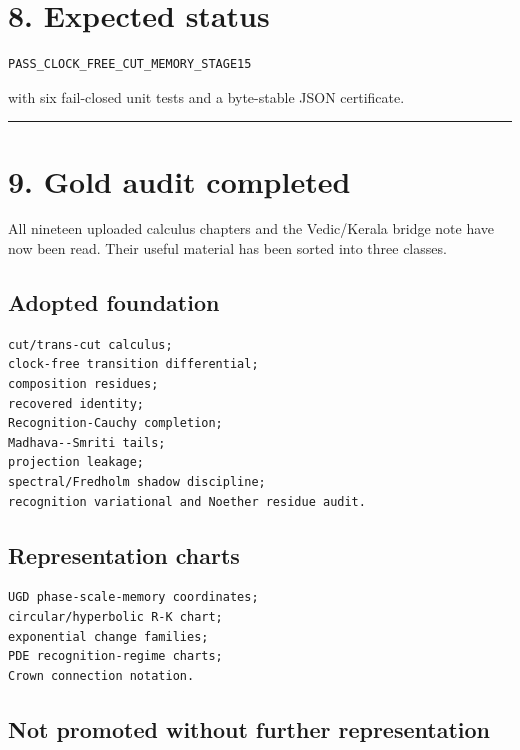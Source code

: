 \hypertarget{expected-status}{%
\section{8. Expected status}\label{expected-status}}

\begin{verbatim}
PASS_CLOCK_FREE_CUT_MEMORY_STAGE15
\end{verbatim}

with six fail-closed unit tests and a byte-stable JSON certificate.

\begin{center}\rule{0.5\linewidth}{0.5pt}\end{center}

\hypertarget{gold-audit-completed}{%
\section{9. Gold audit completed}\label{gold-audit-completed}}

All nineteen uploaded calculus chapters and the Vedic/Kerala bridge note have now been read. Their useful material has been sorted into three classes.

\hypertarget{adopted-foundation}{%
\subsection{Adopted foundation}\label{adopted-foundation}}

\begin{verbatim}
cut/trans-cut calculus;
clock-free transition differential;
composition residues;
recovered identity;
Recognition-Cauchy completion;
Madhava--Smriti tails;
projection leakage;
spectral/Fredholm shadow discipline;
recognition variational and Noether residue audit.
\end{verbatim}

\hypertarget{representation-charts}{%
\subsection{Representation charts}\label{representation-charts}}

\begin{verbatim}
UGD phase-scale-memory coordinates;
circular/hyperbolic R-K chart;
exponential change families;
PDE recognition-regime charts;
Crown connection notation.
\end{verbatim}

\hypertarget{not-promoted-without-further-representation}{%
\subsection{Not promoted without further representation}\label{not-promoted-without-further-representation}}

